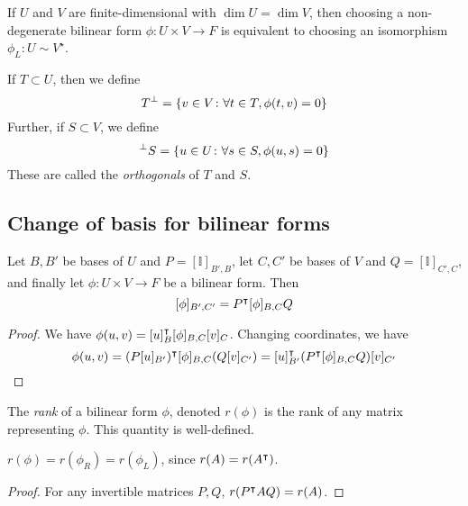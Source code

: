 \begin{corollary}
	If \( U \) and \( V \) are finite-dimensional with \( \dim U = \dim V \), then choosing a non-degenerate bilinear form \( \phi \colon U \times V \to F \) is equivalent to choosing an isomorphism \( \phi_L \colon U \sim V^\star \).
\end{corollary}
\begin{definition}
	If \( T \subset U \), then we define
	\[ T^\perp = \qty{ v \in V \colon \forall t \in T, \phi(t,v) = 0 } \]
	Further, if \( S \subset V \), we define
	\[ ^\perp S = \qty{ u \in U \colon \forall s \in S, \phi(u,s) = 0 } \]
	These are called the \textit{orthogonals} of \( T \) and \( S \).
\end{definition}

\subsection{Change of basis for bilinear forms}
\begin{proposition}
	Let \( B, B' \) be bases of \( U \) and \( P = [\mathbb I]_{B', B} \), let \( C, C' \) be bases of \( V \) and \( Q = [\mathbb I]_{C', C} \), and finally let \( \phi \colon U \times V \to F \) be a bilinear form.
	Then
	\[ [\phi]_{B', C'} = P^\intercal [\phi]_{B,C} Q \]
\end{proposition}
\begin{proof}
	We have \( \phi(u,v) = [u]_B^\intercal [\phi]_{B,C} [v]_C \).
	Changing coordinates, we have
	\[ \phi(u,v) = (P [u]_{B'})^\intercal [\phi]_{B,C} (Q [v]_{C'}) = [u]_{B'}^\intercal (P^\intercal [\phi]_{B,C} Q) [v]_{C'} \]
\end{proof}
\begin{lemma}
	The \textit{rank} of a bilinear form \( \phi \), denoted \( r(\phi) \) is the rank of any matrix representing \( \phi \).
	This quantity is well-defined.
\end{lemma}
\begin{remark}
	\( r(\phi) = r(\phi_R) = r(\phi_L) \), since \( r(A) = r(A^\intercal) \).
\end{remark}
\begin{proof}
	For any invertible matrices \( P, Q \), \( r(P^\intercal A Q) = r(A) \).
\end{proof}
